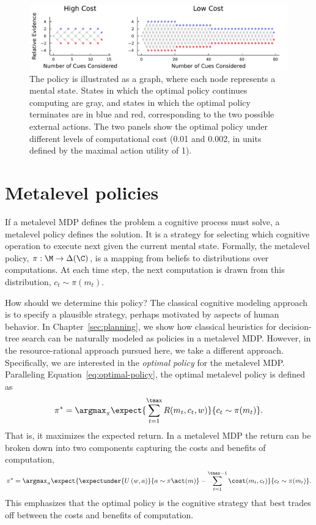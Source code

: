 \begin{figure}[tb!]
  \centering
  \includegraphics[width=\textwidth]{figs/policies.pdf}
  \caption{ The policy is illustrated as a graph, where each node represents a mental state. States in which the optimal policy continues computing are gray, and states in which the optimal policy terminates are in blue and red, corresponding to the two possible external actions. The two panels show the optimal policy under different levels of computational cost (0.01 and 0.002, in units defined by the maximal action utility of 1).
  }
  \label{fig:tally-policies}
\end{figure}

\section{Metalevel policies}\label{sec:metamdp-policy}

If a metalevel MDP defines the problem a cognitive process must solve, a metalevel policy defines the solution. It is a strategy for selecting which cognitive operation to execute next given the current mental state. Formally, the metalevel policy, $\pi: \M \rightarrow \Delta(\C)$, is a mapping from beliefs to distributions over computations. At each time step, the next computation is drawn from this distribution, $c_t \sim \pi(m_t)$.

How should we determine this policy? The classical cognitive modeling approach is to specify a plausible strategy, perhaps motivated by aspects of human behavior. In Chapter~\ref{sec:planning}, we show how classical heuristics for decision-tree search can be naturally modeled as policies in a metalevel MDP. However, in the resource-rational approach pursued here, we take a different approach. Specifically, we are interested in the \emph{optimal policy} for the metalevel MDP. Paralleling Equation~\ref{eq:optimal-policy}, the optimal metalevel policy is defined as
%
\begin{equation}\label{eq:optimal-meta-policy}
  \pi^* = \argmax_\pi \expect{
    \sum_{t=1}^{\tmax} R(m_t, c_t, w)
  }{
    c_t \sim \pi(m_t)
  }.
\end{equation}
That is, it maximizes the expected return. In a metalevel MDP the return can be broken down into two components capturing the costs and benefits of computation,
\begin{equation}\label{eq:optimal-meta-policy-expanded}
  \pi^* = \argmax_\pi \expect{
    \expectunder{U\left(w, a\right)}{a \sim \pi\act(m)} -
      \sum_{t=1}^{\tmax-1} \cost(m_t, c_t)
  }{
    c_t \sim \pi(m_t)
  }.
\end{equation}
This emphasizes that the optimal policy is the cognitive strategy that best trades off between the costs and benefits of computation.

